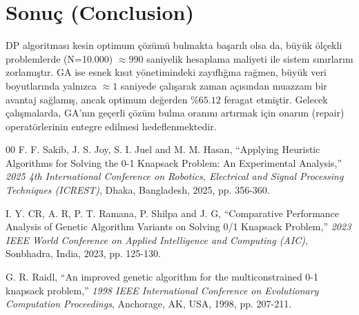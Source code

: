 \documentclass[conference]{IEEEtran}
\begin{document}
\section{Sonuç (Conclusion)}
DP algoritması kesin optimum çözümü bulmakta başarılı olsa da, büyük ölçekli problemlerde (N=10.000) $\approx 990$ saniyelik hesaplama maliyeti ile sistem sınırlarını zorlamıştır. GA ise esnek kısıt yönetimindeki zayıflığına rağmen, büyük veri boyutlarında yalnızca $\approx 1$ saniyede çalışarak zaman açısından muazzam bir avantaj sağlamış, ancak optimum değerden $\%65.12$ feragat etmiştir. Gelecek çalışmalarda, GA'nın geçerli çözüm bulma oranını artırmak için onarım (repair) operatörlerinin entegre edilmesi hedeflenmektedir.

\begin{thebibliography}{00}
 F. F. Sakib, J. S. Joy, S. I. Juel and M. M. Hasan, ``Applying Heuristic Algorithms for Solving the 0-1 Knapsack Problem: An Experimental Analysis,'' \textit{2025 4th International Conference on Robotics, Electrical and Signal Processing Techniques (ICREST)}, Dhaka, Bangladesh, 2025, pp. 356-360.

 I. Y. CR, A. R, P. T. Ramana, P. Shilpa and J. G, ``Comparative Performance Analysis of Genetic Algorithm Variants on Solving 0/1 Knapsack Problem,'' \textit{2023 IEEE World Conference on Applied Intelligence and Computing (AIC)}, Sonbhadra, India, 2023, pp. 125-130.

 G. R. Raidl, ``An improved genetic algorithm for the multiconstrained 0-1 knapsack problem,'' \textit{1998 IEEE International Conference on Evolutionary Computation Proceedings}, Anchorage, AK, USA, 1998, pp. 207-211.
\end{thebibliography}
\end{document}
